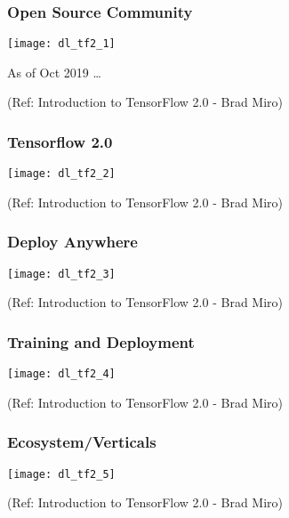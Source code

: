 \begin{frame}[fragile] \frametitle{Open Source Community}

\begin{center}
\texttt{[image: dl\_tf2\_1]}
\end{center}

As of Oct 2019 \ldots

\tiny{(Ref: Introduction to TensorFlow 2.0 - Brad Miro)}
\end{frame}

\begin{frame}[fragile] \frametitle{Tensorflow 2.0}

\begin{center}
\texttt{[image: dl\_tf2\_2]}
\end{center}


\tiny{(Ref: Introduction to TensorFlow 2.0 - Brad Miro)}
\end{frame}

\begin{frame}[fragile] \frametitle{Deploy Anywhere}

\begin{center}
\texttt{[image: dl\_tf2\_3]}
\end{center}


\tiny{(Ref: Introduction to TensorFlow 2.0 - Brad Miro)}
\end{frame}

\begin{frame}[fragile] \frametitle{Training and Deployment}

\begin{center}
\texttt{[image: dl\_tf2\_4]}
\end{center}


\tiny{(Ref: Introduction to TensorFlow 2.0 - Brad Miro)}
\end{frame}

\begin{frame}[fragile] \frametitle{Ecosystem/Verticals}

\begin{center}
\texttt{[image: dl\_tf2\_5]}
\end{center}


\tiny{(Ref: Introduction to TensorFlow 2.0 - Brad Miro)}
\end{frame}




